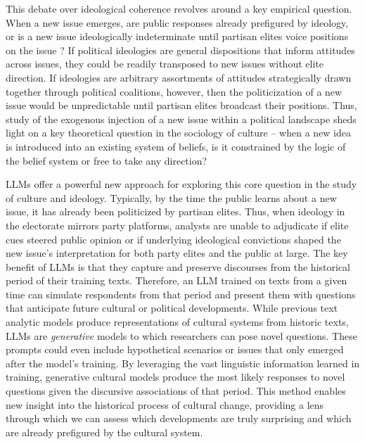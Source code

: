 \documentclass{article}
\begin{document}
This debate over ideological coherence revolves around a key empirical
question. When a new issue emerges, are public responses already
prefigured by ideology, or is a new issue ideologically indeterminate
until partisan elites voice positions on the issue
\parencite{Noel2014-es, Page2010-yj, Zaller1992-eq}? If political ideologies are general
dispositions that inform attitudes across issues, they could be readily
transposed to new issues without elite direction. If ideologies are
arbitrary assortments of attitudes strategically drawn together through
political coalitions, however, then the politicization of a new issue
would be unpredictable until partisan elites broadcast their positions.
Thus, study of the exogenous injection of a new issue within a political
landscape sheds light on a key theoretical question in the sociology of
culture -- when a new idea is introduced into an existing system of
beliefs, is it constrained by the logic of the belief system or free to
take any direction?

LLMs offer a powerful new approach for exploring this core question in
the study of culture and ideology. Typically, by the time the public
learns about a new issue, it has already been politicized by partisan
elites. Thus, when ideology in the electorate mirrors party platforms,
analysts are unable to adjudicate if elite cues steered public opinion
or if underlying ideological convictions shaped the new issue's
interpretation for both party elites and the public at large. The key
benefit of LLMs is that they capture and preserve discourses from the
historical period of their training texts. Therefore, an LLM trained on
texts from a given time can simulate respondents from that period and
present them with questions that anticipate future cultural or political
developments. While previous text analytic models produce
representations of cultural systems from historic texts, LLMs are
\emph{generative} models to which researchers can pose novel questions.
These prompts could even include hypothetical scenarios or issues that
only emerged after the model's training. By leveraging the vast
linguistic information learned in training, generative cultural models
produce the most likely responses to novel questions given the
discursive associations of that period. This method enables new insight
into the historical process of cultural change, providing a lens through
which we can assess which developments are truly surprising and which
are already prefigured by the cultural system.
\end{document}
